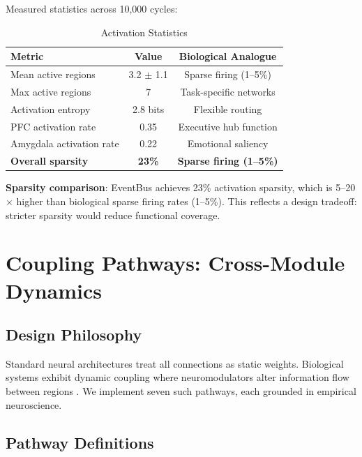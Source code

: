 \documentclass[preprint,12pt]{elsarticle}
\begin{document}
Measured statistics across 10,000 cycles:

\begin{table}[htbp]
\centering
\caption{Activation Statistics}
\label{tab:activation}
\begin{tabular}{lcc}
\toprule
\textbf{Metric} & \textbf{Value} & \textbf{Biological Analogue} \\
\midrule
Mean active regions & 3.2 $\pm$ 1.1 & Sparse firing (1--5\%) \\
Max active regions & 7 & Task-specific networks \\
Activation entropy & 2.8 bits & Flexible routing \\
PFC activation rate & 0.35 & Executive hub function \\
Amygdala activation rate & 0.22 & Emotional saliency \\
\textbf{Overall sparsity} & \textbf{23\%} & \textbf{Sparse firing (1--5\%)} \\
\bottomrule
\end{tabular}
\end{table}

\textbf{Sparsity comparison}: EventBus achieves 23\% activation sparsity, which is 5--20$\times$ higher than biological sparse firing rates (1--5\%). This reflects a design tradeoff: stricter sparsity would reduce functional coverage.

\section{Coupling Pathways: Cross-Module Dynamics}
\label{sec:coupling}

\subsection{Design Philosophy}

Standard neural architectures treat all connections as static weights. Biological systems exhibit dynamic coupling where neuromodulators alter information flow between regions \cite{arnsten2009,schultz2007}. We implement seven such pathways, each grounded in empirical neuroscience.

\subsection{Pathway Definitions}
\end{document}
